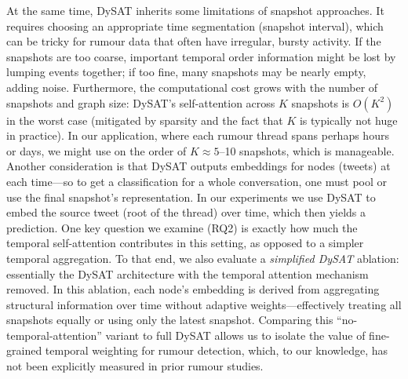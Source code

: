 \documentclass{cshonours}
\begin{document}
At the same time, DySAT inherits some limitations of snapshot approaches. It requires choosing an appropriate time segmentation (snapshot interval), which can be tricky for rumour data that often have irregular, bursty activity. If the snapshots are too coarse, important temporal order information might be lost by lumping events together; if too fine, many snapshots may be nearly empty, adding noise. Furthermore, the computational cost grows with the number of snapshots and graph size: DySAT’s self-attention across $K$ snapshots is $O(K^2)$ in the worst case (mitigated by sparsity and the fact that $K$ is typically not huge in practice). In our application, where each rumour thread spans perhaps hours or days, we might use on the order of $K\approx5$–10 snapshots, which is manageable. Another consideration is that DySAT outputs embeddings for nodes (tweets) at each time—so to get a classification for a whole conversation, one must pool or use the final snapshot’s representation. In our experiments we use DySAT to embed the source tweet (root of the thread) over time, which then yields a prediction. One key question we examine (RQ2) is exactly how much the temporal self-attention contributes in this setting, as opposed to a simpler temporal aggregation. To that end, we also evaluate a \emph{simplified DySAT} ablation: essentially the DySAT architecture with the temporal attention mechanism removed. In this ablation, each node’s embedding is derived from aggregating structural information over time without adaptive weights—effectively treating all snapshots equally or using only the latest snapshot. Comparing this “no-temporal-attention” variant to full DySAT allows us to isolate the value of fine-grained temporal weighting for rumour detection, which, to our knowledge, has not been explicitly measured in prior rumour studies.
\end{document}
